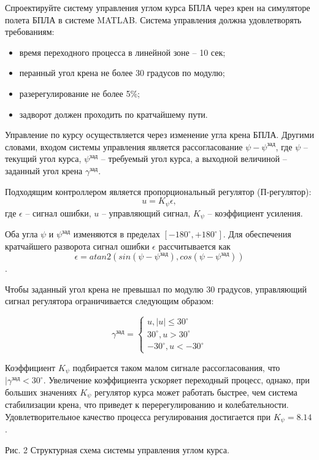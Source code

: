 
Спроектируйте систему управления углом курса БПЛА через крен на симуляторе полета БПЛА в системе MATLAB. Система управления должна удовлетворять требованиям:

\begin{itemize}
	\item время переходного процесса в линейной зоне – 10 сек;
	\item перанный угол крена не более 30 градусов по модулю;
	\item разерегулирование не более 5\%;
	\item задворот должен проходить по кратчайшему пути.
\end{itemize}

\solutionSection

Управление по курсу осуществляется через изменение угла крена БПЛА. Другими словами, входом системы управления является рассогласование $\psi-\psi^\text{зад}$, где $\psi$ – текущий угол курса, $\psi^\text{зад}$ – требуемый угол курса, а выходной величиной – заданный угол крена $\gamma^\text{зад}$. 

Подходящим контроллером является пропорциональный регулятор (П-регулятор):
$$u=K_\psi \epsilon,$$
где $\epsilon$ – сигнал ошибки, $u$ – управляющий сигнал, $K_\psi$ – коэффициент усиления.

Оба угла $\psi$ и $\psi^\text{зад}$ изменяются в пределах $[-180^\circ, +180^\circ]$. Для обеспечения кратчайшего разворота сигнал ошибки $\epsilon$ рассчитывается как
$$\epsilon=atan2(sin(\psi-\psi^\text{зад} ), cos(\psi-\psi^\text{зад} ) )$$.

Чтобы заданный угол крена не превышал по модулю 30 градусов, управляющий сигнал регулятора ограничивается следующим образом:

\begin{displaymath}
    \gamma^\text{зад}= \left\{ \begin{array}{ll}
     u , |u| \leq 30^\circ\\
    30^\circ, u > 30^\circ \\
    -30^\circ,u < -30^\circ
    \end{array} \right.
\end{displaymath}

Коэффициент $K_\psi$ подбирается таком малом сигнале рассогласования, что $|\gamma^\text{зад} <30^\circ$. Увеличение коэффициента ускоряет переходный процесс, однако, при больших значениях $K_\psi$ регулятор курса может работать быстрее, чем система стабилизации крена, что приведет к перерегулированию и колебательности. Удовлетворительное качество процесса регулирования достигается при $K_\psi=8.14$.

\begin{center}
    Рис. 2 Структурная схема системы управления углом курса.
  \end{center} 

